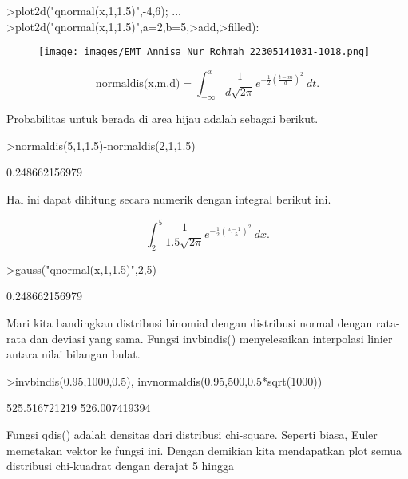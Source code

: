 \documentclass[a4paper,10pt]{article}
\begin{document}
\begin{eulernotebook}
\begin{eulercomment}
\begin{eulercomment}
\begin{eulercomment}
\begin{eulercomment}
\begin{eulerprompt}
>plot2d("qnormal(x,1,1.5)",-4,6);  ...
>plot2d("qnormal(x,1,1.5)",a=2,b=5,>add,>filled):
\end{eulerprompt}
\begin{figure}[h]
    \centering
    \texttt{[image: images/EMT\_Annisa Nur Rohmah\_22305141031-1018.png]}
\end{figure}
\begin{eulerformula}
\[
\text{normaldis(x,m,d)}=\int_{-\infty}^x \frac{1}{d\sqrt{2\pi}}e^{-\frac{1}{2}(\frac{t-m}{d})^2}\ dt.
\]
\end{eulerformula}
\begin{eulercomment}
Probabilitas untuk berada di area hijau adalah sebagai berikut.
\end{eulercomment}
\begin{eulerprompt}
>normaldis(5,1,1.5)-normaldis(2,1,1.5)
\end{eulerprompt}
\begin{euleroutput}
  0.248662156979
\end{euleroutput}
\begin{eulercomment}
Hal ini dapat dihitung secara numerik dengan integral berikut ini.\\
\end{eulercomment}
\begin{eulerformula}
\[
\int_2^5 \frac{1}{1.5\sqrt{2\pi}}e^{-\frac{1}{2}(\frac{x-1}{1.5})^2}\ dx.
\]
\end{eulerformula}
\begin{eulerprompt}
>gauss("qnormal(x,1,1.5)",2,5)
\end{eulerprompt}
\begin{euleroutput}
  0.248662156979
\end{euleroutput}
\begin{eulercomment}
Mari kita bandingkan distribusi binomial dengan distribusi normal
dengan rata-rata dan deviasi yang sama. Fungsi invbindis()
menyelesaikan interpolasi linier antara nilai bilangan bulat.
\end{eulercomment}
\begin{eulerprompt}
>invbindis(0.95,1000,0.5), invnormaldis(0.95,500,0.5*sqrt(1000))
\end{eulerprompt}
\begin{euleroutput}
  525.516721219
  526.007419394
\end{euleroutput}
\begin{eulercomment}
Fungsi qdis() adalah densitas dari distribusi chi-square. Seperti
biasa, Euler memetakan vektor ke fungsi ini. Dengan demikian kita
mendapatkan plot semua distribusi chi-kuadrat dengan derajat 5 hingga

\end{eulercomment}
\end{eulercomment}
\end{eulercomment}
\end{eulercomment}
\end{eulercomment}
\end{eulernotebook}
\end{document}
